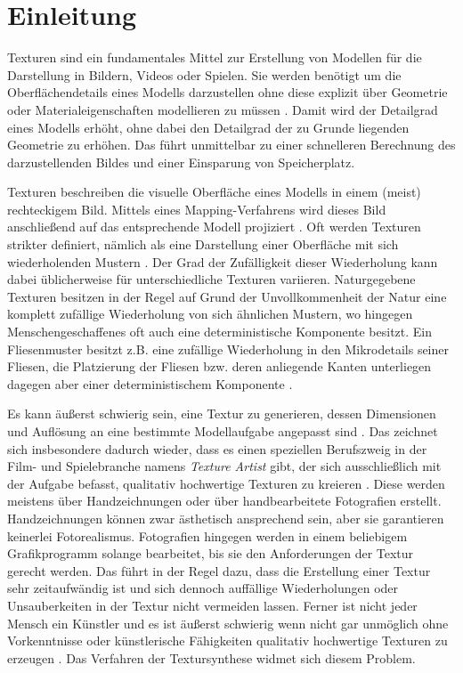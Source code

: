\section{Einleitung}

Texturen sind ein fundamentales Mittel zur Erstellung von Modellen für die Darstellung in Bildern, Videos oder Spielen.
Sie werden benötigt um die Oberflächendetails eines Modells darzustellen ohne diese explizit über Geometrie oder Materialeigenschaften modellieren zu müssen \cite{StateOfTheArt}.
Damit wird der Detailgrad eines Modells erhöht, ohne dabei den Detailgrad der zu Grunde liegenden Geometrie zu erhöhen.
Das führt unmittelbar zu einer schnelleren Berechnung des darzustellenden Bildes und einer Einsparung von Speicherplatz.

Texturen beschreiben die visuelle Oberfläche eines Modells in einem (meist) rechteckigem Bild.
Mittels eines Mapping-Verfahrens wird dieses Bild anschließend auf das entsprechende Modell projiziert \cite{SelfTuning}.
Oft werden Texturen strikter definiert, nämlich als eine Darstellung einer Oberfläche mit sich wiederholenden Mustern \cite{StateOfTheArt}.
Der Grad der Zufälligkeit dieser Wiederholung kann dabei üblicherweise für unterschiedliche Texturen variieren.
Naturgegebene Texturen besitzen in der Regel auf Grund der Unvollkommenheit der Natur eine komplett zufällige Wiederholung von sich ähnlichen Mustern, wo hingegen Menschengeschaffenes oft auch eine deterministische Komponente besitzt.
Ein Fliesenmuster besitzt z.B. eine zufällige Wiederholung in den Mikrodetails seiner Fliesen, die Platzierung der Fliesen bzw. deren anliegende Kanten unterliegen dagegen aber einer deterministischem Komponente \cite{StateOfTheArt}.

Es kann äußerst schwierig sein, eine Textur zu generieren, dessen Dimensionen und Auflösung an eine bestimmte Modellaufgabe angepasst sind \cite{SelfTuning}.
Das zeichnet sich insbesondere dadurch wieder, dass es einen speziellen Berufszweig in der Film- und Spielebranche namens \emph{Texture Artist} gibt, der sich ausschließlich mit der Aufgabe befasst, qualitativ hochwertige Texturen zu kreieren \cite{StateOfTheArt}.
Diese werden meistens über Handzeichnungen oder über handbearbeitete Fotografien erstellt.
Handzeichnungen können zwar ästhetisch ansprechend sein, aber sie garantieren keinerlei Fotorealismus.
Fotografien hingegen werden in einem beliebigem Grafikprogramm solange bearbeitet, bis sie den Anforderungen der Textur gerecht werden.
Das führt in der Regel dazu, dass die Erstellung einer Textur sehr zeitaufwändig ist und sich dennoch auffällige Wiederholungen oder Unsauberkeiten in der Textur nicht vermeiden lassen.
Ferner ist nicht jeder Mensch ein Künstler und es ist äußerst schwierig wenn nicht gar unmöglich ohne Vorkenntnisse oder künstlerische Fähigkeiten qualitativ hochwertige Texturen zu erzeugen \cite{StateOfTheArt}.
Das Verfahren der Textursynthese widmet sich diesem Problem.